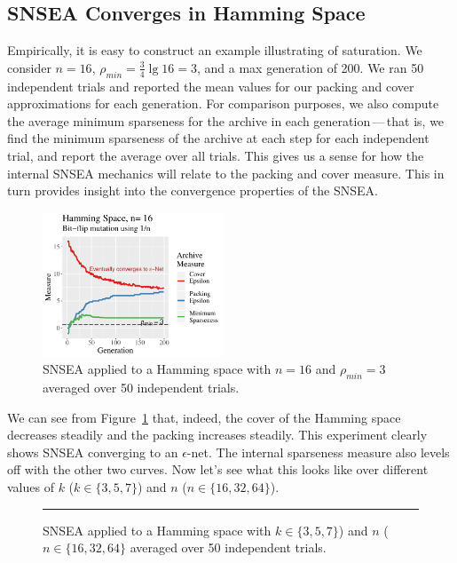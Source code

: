 \documentclass[twoside]{article}
\begin{document}
\subsection{SNSEA Converges in Hamming Space}
\label{subsec:hamming}

Empirically, it is easy to construct an example illustrating of saturation.  We consider $n=16$, $\rho_{min} = \frac{3}{4} \lg 16 = 3$, and a max generation of 200.  We ran 50 independent trials and reported the mean values for our packing and cover approximations for each generation.  For comparison purposes, we also compute the average minimum sparseness for the archive in each generation\,---\,that is, we find the minimum sparseness of the archive at each step for each independent trial, and report the average over all trials.  This gives us a sense for how the internal SNSEA mechanics will relate to the packing and cover measure.  This in turn provides insight into the convergence properties of the SNSEA.
%
\begin{figure}[t]
\includegraphics[width=0.48\textwidth]{Figures/hamming-r3-n16.pdf}
\caption{\label{fig:hamming} SNSEA applied to a Hamming space with $n=16$ and $\rho_{min} = 3$ averaged over 50 independent trials.}
\end{figure}
%
We can see from Figure~\ref{fig:hamming} that, indeed, the cover of the Hamming space decreases steadily and the packing increases steadily.  This experiment clearly shows SNSEA converging to an $\epsilon$-net.  The internal sparseness measure also levels off with the other two curves.  Now let's see what this looks like over different values of $k$ ($k\in\{3,5,7\}$) and $n$ ($n\in\{16, 32, 64\}$).
%
\begin{figure}[t]
\rule{0.8\textwidth}{1.5\textwidth}
\caption{\label{fig:hamming-general} SNSEA applied to a Hamming space with $k\in\{3,5,7\}$) and $n$ ($n\in\{16, 32, 64\}$ averaged over 50 independent trials.}
\end{figure}
%
\end{document}
